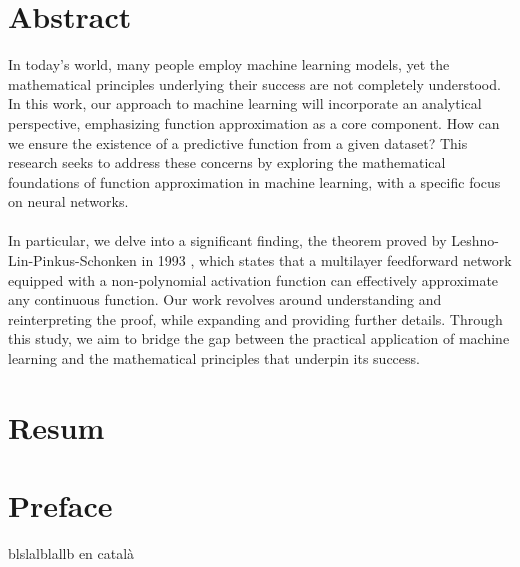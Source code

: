 \documentclass[../../main.tex]{subfiles}
\begin{document}
\section*{Abstract} %


\noindent In today's world, many people employ machine learning models, yet the mathematical principles underlying their success are not completely understood. In this work, our approach to machine learning will incorporate an analytical perspective, emphasizing function approximation as a core component. How can we ensure the existence of a predictive function from a given dataset? This research seeks to address these concerns by exploring the mathematical foundations of function approximation in machine learning, with a specific focus on neural networks.
\\ \\
In particular, we delve into a significant finding, the theorem proved by Leshno-Lin-Pinkus-Schonken in 1993 \cite{leshno1993multilayer}, which states that a multilayer feedforward network equipped with a non-polynomial activation function can effectively approximate any continuous function. Our work revolves around understanding and reinterpreting the proof, while expanding and providing further details.
Through this study, we aim to bridge the gap between the practical application of machine learning and the mathematical principles that underpin its success.

\newpage

\section*{Resum}
\newpage
\section*{Preface}



blslalblallb en català
\end{document}
